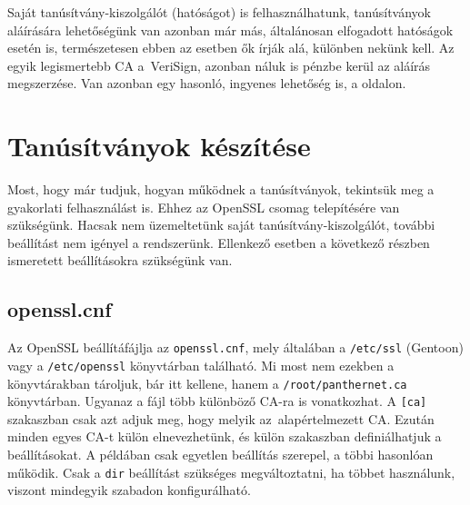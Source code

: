 Saját tanúsítvány-kiszolgálót (hatóságot) is felhasználhatunk, tanúsítványok aláírására lehetőségünk van azonban már
más, általánosan elfogadott hatóságok esetén is, természetesen ebben az esetben ők írják alá, különben nekünk kell. Az
egyik legismertebb CA a~VeriSign, azonban náluk is pénzbe kerül az aláírás megszerzése. Van azonban egy hasonló,
ingyenes lehetőség is, a  oldalon.

\section{Tanúsítványok készítése}
Most, hogy már tudjuk, hogyan működnek a tanúsítványok, tekintsük meg a gyakorlati felhasználást is. Ehhez az OpenSSL
csomag telepítésére van szükségünk. Hacsak nem üzemeltetünk saját tanúsítvány-kiszolgálót, további beállítást nem
igényel a rendszerünk. Ellenkező esetben a következő részben ismeretett beállításokra szükségünk van.

\subsection{openssl.cnf}
Az OpenSSL beállítáfájlja az \texttt{openssl.cnf}, mely általában a \texttt{/etc/ssl} (Gentoon) vagy a
\texttt{/etc/openssl} könyvtárban található. Mi most nem
ezekben a könyvtárakban tároljuk, bár itt kellene, hanem a \texttt{/root/panthernet.ca} könyvtárban. Ugyanaz a fájl több
különböző CA-ra is vonatkozhat. A \texttt{[ca]} szakaszban csak azt adjuk meg, hogy melyik az~alapértelmezett CA. Ezután
minden egyes CA-t külön elnevezhetünk, és külön szakaszban definiálhatjuk a beállításokat. A példában csak egyetlen
beállítás szerepel, a többi hasonlóan működik. Csak a \texttt{dir} beállítást szükséges megváltoztatni, ha többet
használunk, viszont mindegyik szabadon konfigurálható.

